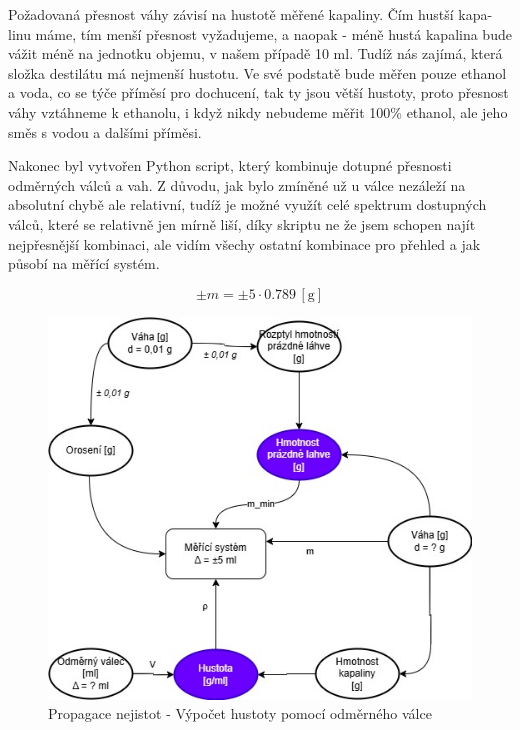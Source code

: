 Požadovaná přesnost váhy závisí na hustotě měřené kapaliny. Čím hustší kapa-
linu máme, tím menší přesnost vyžadujeme, a naopak - méně hustá kapalina bude
vážit méně na jednotku objemu, v našem případě 10 ml. Tudíž nás zajímá, která
složka destilátu má nejmenší hustotu. Ve své podstatě bude měřen pouze ethanol
a voda, co se týče příměsí pro dochucení, tak ty jsou větší hustoty, proto přesnost váhy vztáhneme k ethanolu, i když nikdy nebudeme měřit 100\% ethanol, ale jeho směs s vodou a dalšími příměsi.

Nakonec byl vytvořen Python script, který kombinuje dotupné přesnosti odměrných válců a vah. Z důvodu, jak bylo zmíněné už u válce nezáleží na absolutní chybě ale relativní, tudíž je možné využít celé spektrum dostupných válců, které se relativně jen mírně liší, díky skriptu ne že jsem schopen najít nejpřesnější kombinaci, ale vidím všechy ostatní kombinace pro přehled a jak působí na měřící systém.

\begin{equation}
    \pm m = \pm 5 \cdot 0.789 \, \left[\mathrm{g}\right] \label{objem_kapalina}
\end{equation}





\begin{figure}[H]
    \begin{center}
        \includegraphics[scale=0.6]{obrazky/Propagace nejistot-Metoda 2+.jpg}
    \end{center}
    \caption{Propagace nejistot - Výpočet hustoty pomocí odměrného válce}
\end{figure}

